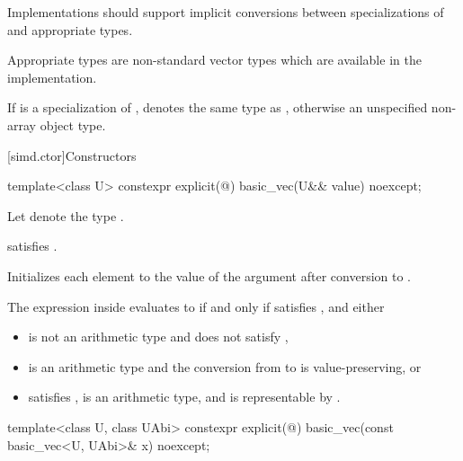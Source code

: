 \pnum
\recommended
Implementations should support implicit conversions between specializations of
 and appropriate  types.
\begin{note}
Appropriate types are non-standard vector types which are available in the
implementation.
\end{note}

\pnum
If  is a specialization of ,
 denotes the same type as
,
otherwise an unspecified non-array object type.

[simd.ctor]{Constructors}

\begin{itemdecl}
template<class U> constexpr explicit(@\seebelow@) basic_vec(U&& value) noexcept;
\end{itemdecl}

\begin{itemdescr}
\pnum
Let  denote the type .

\pnum
\constraints
{} satisfies .

\pnum
\effects
Initializes each element to the value of the argument after conversion to
.

\pnum
\remarks
The expression inside  evaluates to  if and only if
 satisfies , and either
\begin{itemize}
 \item
    is not an arithmetic type and does not satisfy
   ,
 \item
    is an arithmetic type and the conversion from  to
    is value-preserving, or
 \item
    satisfies ,
    is an arithmetic type, and
    is representable by .
\end{itemize}
\end{itemdescr}

\begin{itemdecl}
template<class U, class UAbi>
  constexpr explicit(@\seebelow@) basic_vec(const basic_vec<U, UAbi>& x) noexcept;
\end{itemdecl}

